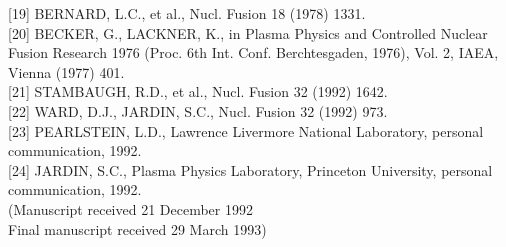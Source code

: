 \documentclass[10pt]{article}
\begin{document}
[19] BERNARD, L.C., et al., Nucl. Fusion 18 (1978) 1331.\\[0pt]
[20] BECKER, G., LACKNER, K., in Plasma Physics and Controlled Nuclear Fusion Research 1976 (Proc. 6th Int. Conf. Berchtesgaden, 1976), Vol. 2, IAEA, Vienna (1977) 401.\\[0pt]
[21] STAMBAUGH, R.D., et al., Nucl. Fusion 32 (1992) 1642.\\[0pt]
[22] WARD, D.J., JARDIN, S.C., Nucl. Fusion 32 (1992) 973.\\[0pt]
[23] PEARLSTEIN, L.D., Lawrence Livermore National Laboratory, personal communication, 1992.\\[0pt]
[24] JARDIN, S.C., Plasma Physics Laboratory, Princeton University, personal communication, 1992.\\
(Manuscript received 21 December 1992\\
Final manuscript received 29 March 1993)
\end{document}
